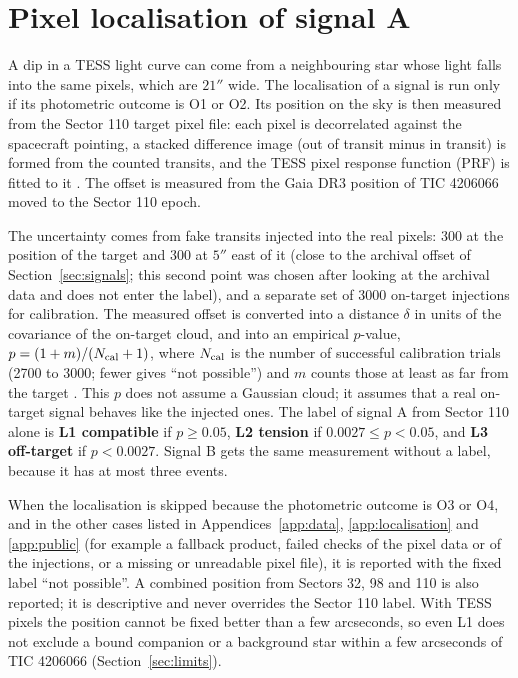 \section{Pixel localisation of signal A} \label{sec:localisation}

A dip in a TESS light curve can come from a neighbouring star whose light falls into the same pixels, which are
$21''$ wide. The localisation of a signal is run only if its photometric outcome is O1 or O2. Its position on the sky
is then measured from the Sector 110 target pixel file: each pixel is decorrelated against the spacecraft pointing, a stacked difference image (out of
transit minus in transit) is formed from the counted transits, and the TESS pixel response function (PRF) is fitted to
it \citep{Bell2022}. The offset is measured from the Gaia DR3 position of TIC 4206066 moved to the Sector 110 epoch.

The uncertainty comes from fake transits injected into the real pixels: 300 at the position of the target and 300 at
$5''$ east of it (close to the archival offset of Section~\ref{sec:signals}; this second point was chosen after looking at
the archival data and does not enter the label), and a separate set of 3000 on-target injections for calibration. The measured offset is converted
into a distance $\delta$ in units of the covariance of the on-target cloud, and into an empirical $p$-value,
$p = (1 + m)/(N_{\rm cal} + 1)$, where $N_{\rm cal}$ is the number of successful calibration trials
(2700 to 3000; fewer gives ``not possible'') and $m$ counts those at least as far from the target
\citep{DavisonHinkley1997,North2002,Bates2023}. This $p$ does not assume a Gaussian cloud; it assumes that a real
on-target signal behaves like the injected ones. The label of signal A from Sector 110 alone is
\textbf{L1 compatible} if $p \geq 0.05$, \textbf{L2 tension} if $0.0027 \leq p < 0.05$, and \textbf{L3 off-target} if
$p < 0.0027$. Signal B gets the same measurement without a label, because it has at most three events.

When the localisation is skipped because the photometric outcome is O3 or O4, and in the other cases listed in
Appendices~\ref{app:data}, \ref{app:localisation} and \ref{app:public} (for example a fallback product, failed checks
of the pixel data or of the injections, or a missing or unreadable pixel file), it is reported with the fixed label
``not possible''. A combined position
from Sectors 32, 98 and 110 is also reported; it is descriptive and never overrides the Sector 110 label. With TESS
pixels the position cannot be fixed better than a few arcseconds, so even L1 does not exclude a bound companion or a background star within a few
arcseconds of TIC 4206066 (Section~\ref{sec:limits}).

